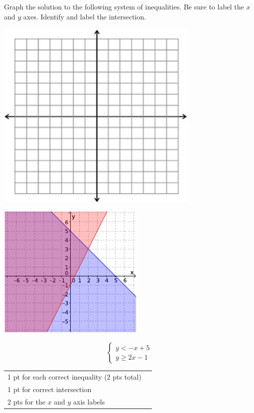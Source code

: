 {
	Graph the solution to the following system of inequalities. Be sure to label the $x$ and $y$ axes. Identify and label the intersection. \begin{onlyproblem}\begin{center}\includegraphics{fig-graphpaper.png}\end{center}\end{onlyproblem} \begin{onlysolution}\begin{center}\includegraphics{fig095-12-b-answer}\end{center}\end{onlysolution}
	$$\begin{cases} y<-x+5\\ y\geq 2x-1\end{cases}$$
}
{
	\begin{tabular}{l r}
	1 pt for each correct inequality (2 pts total)\\
	1 pt for correct intersection\\
	2 pts for the $x$ and $y$ axis labels\\
	\end{tabular}
}

